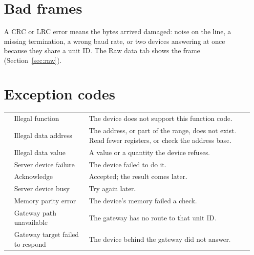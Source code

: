 \section{Bad frames}

A CRC or LRC error means the bytes arrived damaged: noise on the line, a
missing termination, a wrong baud rate, or two devices answering at once
because they share a unit ID. The Raw data tab shows the frame
(Section~\ref{sec:raw}).

\section{Exception codes}
\label{app:exceptions}

\begin{center}
\begin{tabularx}{\linewidth}{l l L}
  \toprule
   &  &  \\
  \midrule
   & Illegal function & The device does not support this function code. \\
   & Illegal data address & The address, or part of the range, does not
    exist. Read fewer registers, or check the address base. \\
   & Illegal data value & A value or a quantity the device refuses. \\
   & Server device failure & The device failed to do it. \\
   & Acknowledge & Accepted; the result comes later. \\
   & Server device busy & Try again later. \\
   & Memory parity error & The device's memory failed a check. \\
   & Gateway path unavailable & The gateway has no route to that unit ID. \\
   & Gateway target failed to respond & The device behind the gateway did not answer. \\
  \bottomrule
\end{tabularx}
\end{center}

